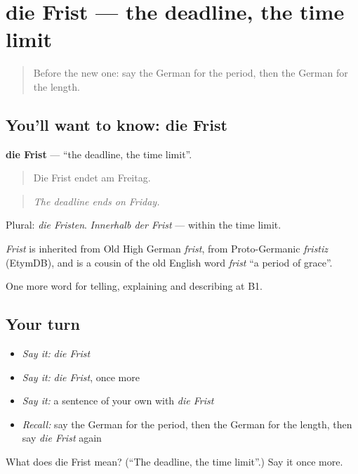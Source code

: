 \section[die Frist]{die Frist — the deadline, the time limit}

\label{lesson:GE-C268-frist}



\begin{quote}
Before the new one: say the German for the period, then the German for the length.
\end{quote}

\subsection*{You'll want to know: die Frist}
\textbf{die Frist} — \textquotedblleft{}the deadline, the time limit\textquotedblright{}.

\begin{quote}
Die Frist endet am Freitag.
\end{quote}

\begin{quote}
\emph{The deadline ends on Friday.}
\end{quote}

Plural: \emph{die Fristen}. \emph{Innerhalb der Frist} — within the time limit.

\begin{cousinweb}
\emph{Frist} is inherited from Old High German \emph{frist}, from Proto-Germanic \emph{fristiz} (EtymDB), and is a cousin of the old English word \emph{frist} \textquotedblleft{}a period of grace\textquotedblright{}.
\end{cousinweb}

\begin{grammarlens}[title={What you've built}]
One more word for telling, explaining and describing at B1.
\end{grammarlens}

\subsection*{Your turn}
\begin{itemize}
\raggedright
  \item \emph{Say it:} \emph{die Frist}
  \item \emph{Say it:} \emph{die Frist}, once more
  \item \emph{Say it:} a sentence of your own with \emph{die Frist}
  \item \emph{Recall:} say the German for the period, then the German for the length, then say \emph{die Frist} again
\end{itemize}

\begin{tcolorbox}[breakable,colback=teal!4,colframe=teal!35!black,title={Before you move on}]
What does die Frist mean? (\textquotedblleft{}The deadline, the time limit\textquotedblright{}.) Say it once more.
\end{tcolorbox}
